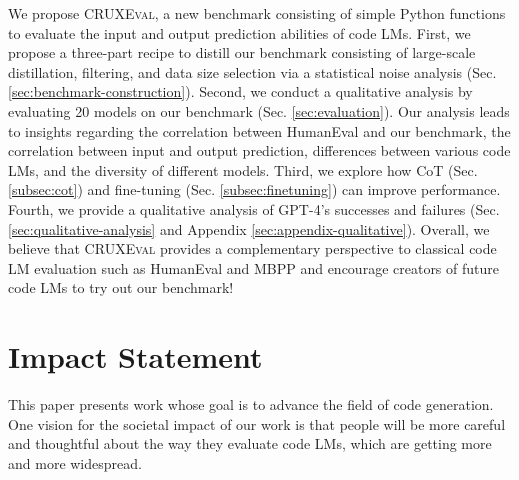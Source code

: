 \documentclass{article}
\newcommand{\benchmark}{\textsc{CRUXEval}\xspace}
\theoremstyle{plain}
\theoremstyle{definition}
\theoremstyle{remark}
\begin{document}
We propose \benchmark, a new benchmark consisting of simple Python functions to evaluate the input and output prediction abilities of code LMs. First, we propose a three-part recipe to distill our benchmark consisting of large-scale distillation, filtering, and data size selection via a statistical noise analysis (Sec. \ref{sec:benchmark-construction}). Second, we conduct a qualitative analysis by evaluating 20 models on our benchmark (Sec. \ref{sec:evaluation}). Our analysis leads to insights regarding the correlation between HumanEval and our benchmark, the correlation between input and output prediction, differences between various code LMs, and the diversity of different models. Third, we explore how CoT (Sec. \ref{subsec:cot}) and fine-tuning (Sec. \ref{subsec:finetuning}) can improve performance. Fourth, we provide a qualitative analysis of GPT-4's successes and failures (Sec. \ref{sec:qualitative-analysis} and Appendix \ref{sec:appendix-qualitative}). Overall, we believe that \benchmark provides a complementary perspective to classical code LM evaluation such as HumanEval and MBPP and encourage creators of future code LMs to try out our benchmark!

\section*{Impact Statement}
This paper presents work whose goal is to advance the field of code generation. One vision for the societal impact of our work is that people will be more careful and thoughtful about the way they evaluate code LMs, which are getting more and more widespread.





\newpage
\appendix
\onecolumn






\end{document}
